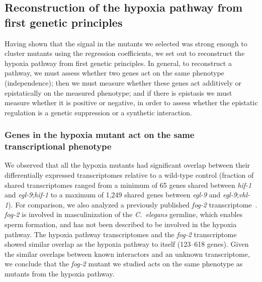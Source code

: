 \documentclass[9pt,twocolumn,twoside]{pnas-new}
\newcommand{\cel}{\emph{C.~elegans}}
\newcommand{\egl}{\emph{egl-9}}
\newcommand{\vhl}{\emph{vhl-1}}
\newcommand{\hif}{\emph{hif-1}}
\newcommand{\fog}{\emph{fog-2}}
\begin{document}
\subsection*{Reconstruction of the hypoxia pathway from first genetic principles}
\label{sec:reconstruct}
Having shown that the signal in the mutants we selected was strong enough to
cluster mutants using the regression coefficients, we set out to reconstruct the
hypoxia pathway from first genetic principles. In general, to reconstruct a pathway,
we must assess whether two genes act on the same phenotype (independence);
then we must measure whether these genes act additively or epistatically on the
measured phenotype; and if there is epistasis we must measure whether it is positive
or negative, in order to assess whether the epistatic regulation is a genetic
suppression or a synthetic interaction.

\subsubsection{Genes in the hypoxia mutant act on the same transcriptional phenotype}
\label{sec:phenotypes}
We observed that all the hypoxia mutants had significant overlap between their
differentially expressed transcriptomes relative to a wild-type control
(fraction of shared transcriptomes ranged from a minimum of 65 genes
shared between \hif{} and \egl{};\hif{} to a maximum of 1,249 shared genes between
\egl{} and \egl{};\vhl{}). For comparison, we also analyzed a previously published
\fog{} transcriptome~\cite{Angeles-Albores2016a}. \fog{} is involved in masculinization
of the \cel{} germline, which enables sperm formation, and has not been described
to be involved in the hypoxia pathway. The hypoxia pathway transcriptomes
and the \fog{} transcriptome showed similar overlap as the hypoxia pathway to itself
(123--618 genes). Given the similar overlaps between known interactors and an unknown
transcriptome, we conclude that the \fog{} mutant we studied acts on the same
phenotype as mutants from the hypoxia pathway.
\end{document}
